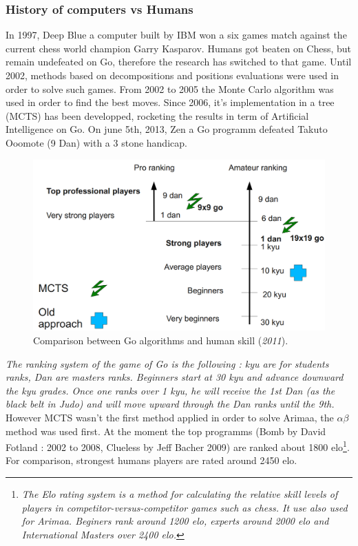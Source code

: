 

\subsubsection{History of computers vs Humans}
In 1997, Deep Blue a computer built by IBM won a six games match against the current chess world champion Garry Kasparov. Humans got beaten on Chess, but remain undefeated on Go, therefore the research has switched to that game. Until 2002, methods based on decompositions and positions evaluations were used in order to solve such games. From 2002 to 2005 the Monte Carlo algorithm was used in order to find the best moves. Since 2006, it's implementation in a tree (MCTS) has been developped, rocketing the results in term of Artificial Intelligence on Go. On june 5th, 2013, Zen a Go programm defeated Takuto Ooomote (9 Dan) with a 3 stone handicap.
\begin{figure}[H]
\centering
\includegraphics[width=12cm]{2_State_of_the_art/Arimaa_on_MCTS_Benoit/img/ranking.png}
\caption{\label{fig:ranking}Comparison between Go algorithms and human skill (\textit{2011}).}
\end{figure}
\textit{The ranking system of the game of Go is the following : kyu are for students ranks, Dan are masters ranks. Beginners start at 30 kyu and advance downward the kyu grades. Once one ranks over 1 kyu, he will receive the 1st Dan (as the black belt in Judo) and will move upward through the Dan ranks until the 9th.}\\
However MCTS wasn't the first method applied in order to solve Arimaa, the \ensuremath{\alpha\beta} method was used first. At the moment the top programms (Bomb by David Fotland : 2002 to 2008, Clueless by Jeff Bacher 2009) are ranked about 1800 elo\footnote{\textit{The Elo rating system is a method for calculating the relative skill levels of players in competitor-versus-competitor games such as chess. It use also used for Arimaa. Beginers rank around 1200 elo, experts around 2000 elo and International Masters over 2400 elo.}}. For comparison, strongest humans players are rated around 2450 elo\elocomparison.
\medskip
